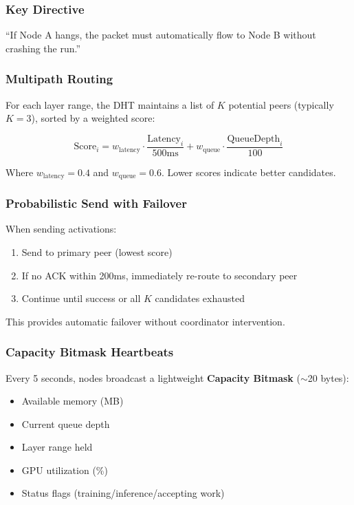 \documentclass[11pt,a4paper]{article}
\begin{document}
\subsubsection{Key Directive}
``If Node A hangs, the packet must automatically flow to Node B without crashing the run.''

\subsubsection{Multipath Routing}

For each layer range, the DHT maintains a list of $K$ potential peers (typically $K=3$), sorted by a weighted score:

\begin{equation}
\text{Score}_i = w_{\text{latency}} \cdot \frac{\text{Latency}_i}{500\text{ms}} + w_{\text{queue}} \cdot \frac{\text{QueueDepth}_i}{100}
\end{equation}

Where $w_{\text{latency}} = 0.4$ and $w_{\text{queue}} = 0.6$. Lower scores indicate better candidates.

\subsubsection{Probabilistic Send with Failover}

When sending activations:
\begin{enumerate}
    \item Send to primary peer (lowest score)
    \item If no ACK within 200ms, immediately re-route to secondary peer
    \item Continue until success or all $K$ candidates exhausted
\end{enumerate}

This provides automatic failover without coordinator intervention.

\subsubsection{Capacity Bitmask Heartbeats}

Every 5 seconds, nodes broadcast a lightweight \textbf{Capacity Bitmask} ($\sim$20 bytes):
\begin{itemize}
    \item Available memory (MB)
    \item Current queue depth
    \item Layer range held
    \item GPU utilization (\%)
    \item Status flags (training/inference/accepting work)
\end{itemize}
\end{document}

